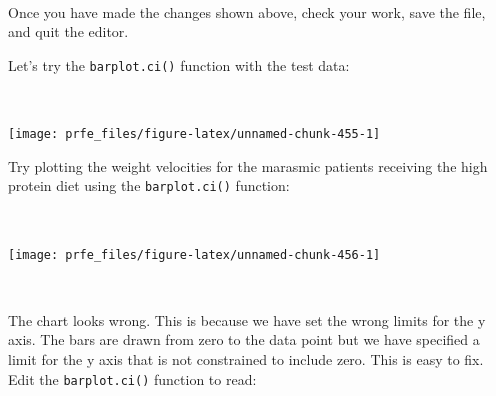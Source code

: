 \documentclass[12pt,a4paper]{book}
\newenvironment{Shaded}{\begin{snugshade}}{\end{snugshade}}
\newcommand{\KeywordTok}[1]{\textcolor[rgb]{0.13,0.29,0.53}{\textbf{#1}}}
\newcommand{\NormalTok}[1]{#1}
\newcommand{\OperatorTok}[1]{\textcolor[rgb]{0.81,0.36,0.00}{\textbf{#1}}}
\theoremstyle{definition}
\theoremstyle{definition}
\theoremstyle{definition}
\theoremstyle{remark}
\begin{document}
~

Once you have made the changes shown above, check your work, save the
file, and quit the editor.

Let's try the \texttt{barplot.ci()} function with the test data:

~

\begin{Shaded}
\end{Shaded}

\begin{center}\texttt{[image: prfe\_files/figure-latex/unnamed-chunk-455-1]} \end{center}

\newpage

Try plotting the weight velocities for the marasmic patients receiving
the high protein diet using the \texttt{barplot.ci()} function:

~

\begin{Shaded}
\end{Shaded}

\begin{center}\texttt{[image: prfe\_files/figure-latex/unnamed-chunk-456-1]} \end{center}

~

The chart looks wrong. This is because we have set the wrong limits for
the y axis. The bars are drawn from zero to the data point but we have
specified a limit for the y axis that is not constrained to include
zero. This is easy to fix. Edit the \texttt{barplot.ci()} function to
read:

~
\end{document}
